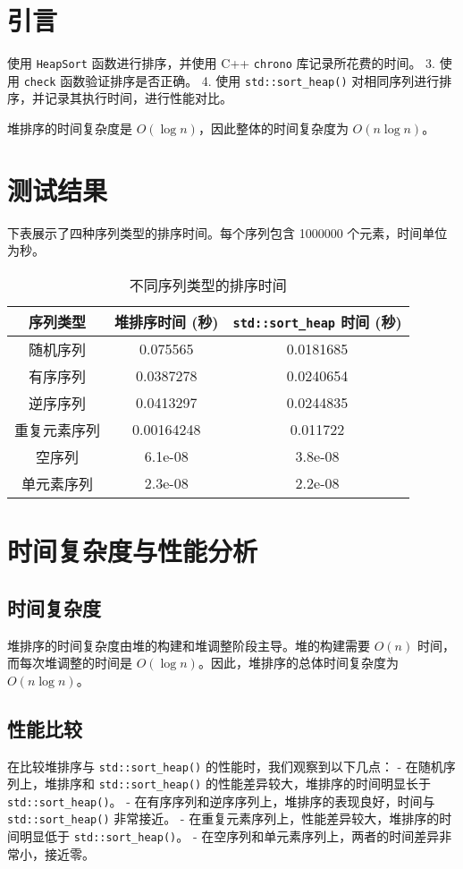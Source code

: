 \documentclass{article}
\begin{document}
\pagestyle{fancy}
\fancyhead{}

\section{引言}
使用 \texttt{HeapSort} 函数进行排序，并使用 C++ \texttt{chrono} 库记录所花费的时间。
3. 使用 \texttt{check} 函数验证排序是否正确。
4. 使用 \texttt{std::sort\_heap()} 对相同序列进行排序，并记录其执行时间，进行性能对比。

堆排序的时间复杂度是 $O(\log n)$，因此整体的时间复杂度为 $O(n \log n)$。

\section{测试结果}
下表展示了四种序列类型的排序时间。每个序列包含 1000000 个元素，时间单位为秒。

\begin{table}[h!]
\centering
\caption{不同序列类型的排序时间}
\begin{tabular}{ccc}
\toprule
序列类型 & 堆排序时间 (秒) & \texttt{std::sort\_heap} 时间 (秒) \\
\midrule
随机序列 & 0.075565 & 0.0181685 \\
有序序列 & 0.0387278 & 0.0240654 \\
逆序序列 & 0.0413297 & 0.0244835 \\
重复元素序列 & 0.00164248 & 0.011722 \\
空序列 & 6.1e-08 & 3.8e-08 \\
单元素序列 & 2.3e-08 & 2.2e-08 \\
\bottomrule
\end{tabular}
\end{table}

\section{时间复杂度与性能分析}
\subsection{时间复杂度}
堆排序的时间复杂度由堆的构建和堆调整阶段主导。堆的构建需要 $O(n)$ 时间，而每次堆调整的时间是 $O(\log n)$。因此，堆排序的总体时间复杂度为 $O(n \log n)$。

\subsection{性能比较}
在比较堆排序与 \texttt{std::sort\_heap()} 的性能时，我们观察到以下几点：
- 在随机序列上，堆排序和 \texttt{std::sort\_heap()} 的性能差异较大，堆排序的时间明显长于 \texttt{std::sort\_heap()}。
- 在有序序列和逆序序列上，堆排序的表现良好，时间与 \texttt{std::sort\_heap()} 非常接近。
- 在重复元素序列上，性能差异较大，堆排序的时间明显低于 \texttt{std::sort\_heap()}。
- 在空序列和单元素序列上，两者的时间差异非常小，接近零。
\end{document}
